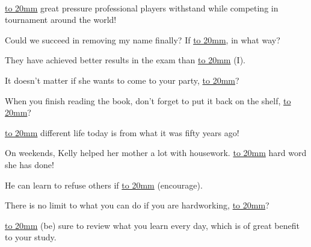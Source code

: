 \\
\item {
    \underline{\hbox to 20mm{}} great pressure professional players withstand while competing in tournament around the world!
} 
\\
\item {
    Could we succeed in removing my name finally? If \underline{\hbox to 20mm{}}, in what way?
} 
\\
\item {
    They have achieved  better results in the exam than \underline{\hbox to 20mm{}} (I).
} 
\\
\item {
    It doesn't matter if she wants to come to your party, \underline{\hbox to 20mm{}}?
} 
\\
\item {
    When you finish reading the book, don't forget to put it back on the shelf, \underline{\hbox to 20mm{}}?
} 
\\
\item {
    \underline{\hbox to 20mm{}} different life today is from what it was fifty years ago!
} 
\\
\item {
    On weekends, Kelly helped her mother a lot with housework. \underline{\hbox to 20mm{}} hard word she has done!
} 
\\
\item {
    He can learn to refuse others if \underline{\hbox to 20mm{}} (encourage).
} 
\\
\item {
    There is no limit to what you can do if you are hardworking,  \underline{\hbox to 20mm{}}?
} 
\\
\item {
    \underline{\hbox to 20mm{}} (be) sure to review what you learn every day, which is of great benefit to your study.
} 
\\